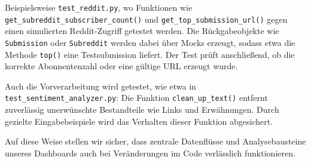 Beispielsweise \texttt{test\_reddit.py},\newline
wo Funktionen wie \texttt{get\_subreddit\_subscriber\_count()}\newline
und \texttt{get\_top\_submission\_url()} gegen einen simulierten Reddit-Zugriff getestet werden. Die Rückgabeobjekte wie \texttt{Submission} oder \texttt{Subreddit} werden dabei über Mocks erzeugt, sodass etwa die Methode \texttt{top()} eine Testsubmission liefert. Der Test prüft anschließend, ob die korrekte Abonnentenzahl oder eine gültige URL erzeugt wurde.

Auch die Vorverarbeitung wird getestet,\newline
wie etwa in \texttt{test\_sentiment\_analyzer.py}: Die Funktion \texttt{clean\_up\_text()} entfernt zuverlässig unerwünschte Bestandteile wie Links und Erwähnungen. Durch gezielte Eingabebeispiele wird das Verhalten dieser Funktion abgesichert.

Auf diese Weise stellen wir sicher, dass zentrale Datenflüsse und Analysebausteine unseres Dashboards auch bei Veränderungen im Code verlässlich funktionieren.
